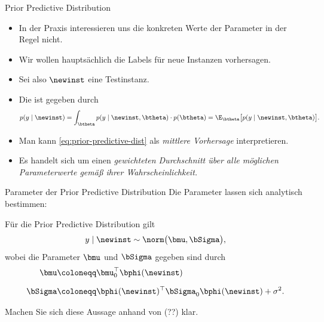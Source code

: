 \begin{frame}{Prior Predictive Distribution}{}
	\begin{itemize}
		\item In der Praxis interessieren uns die konkreten Werte der Parameter in der Regel nicht.
		\item Wir wollen hauptsächlich die Labels für neue Instanzen vorhersagen.
		\item Sei also $\newinst$ eine Testinstanz.
		\item Die  ist gegeben durch
		\begin{equation} \label{eq:prior-predictive-dist}
			p(y \mid \newinst)
				= \int_{\btheta} p(y \mid \newinst, \btheta) \cdot p(\btheta)
				= \E_{\btheta}\bigl[ p(y \mid \newinst, \btheta) \bigr].
		\end{equation}
		\item Man kann \eqref{eq:prior-predictive-dist} als \textit{mittlere Vorhersage} interpretieren.
		\item Es handelt sich um einen \textit{gewichteten Durchschnitt über alle möglichen Parameterwerte gemäß ihrer Wahrscheinlichkeit.}
	\end{itemize}
\end{frame}


\begin{frame}{Parameter der Prior Predictive Distribution}{}
	Die Parameter lassen sich analytisch bestimmen:
	
	\begin{mytheo}
		Für die Prior Predictive Distribution gilt $$y \mid \newinst \sim \norm\bigl( \bmu, \bSigma \bigr),$$ wobei die Parameter
		$\bmu$ und $\bSigma$ gegeben sind durch
		\begin{align*}
			\bmu
				&\coloneqq \bmu_0^\top \bphi(\newinst)
		\\[2mm]
			\bSigma
				&\coloneqq \bphi(\newinst)^\top \bSigma_0 \bphi(\newinst) + \sigma^2.
		\end{align*}
	\end{mytheo}

	\begin{mytask}
		Machen Sie sich diese Aussage anhand von (??) klar.
	\end{mytask}
\end{frame}



